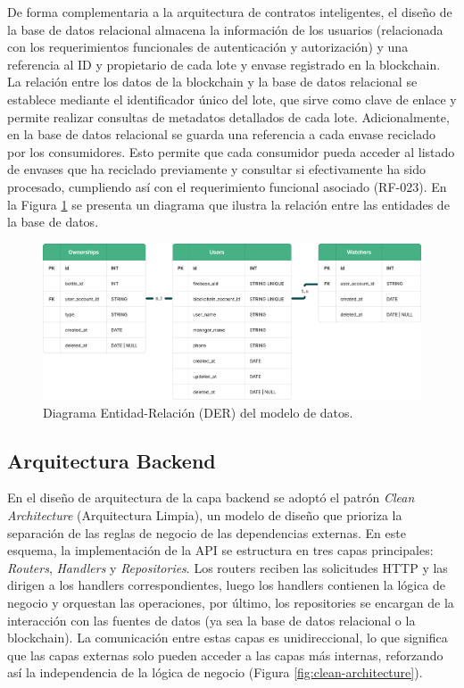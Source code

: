De forma complementaria a la arquitectura de contratos inteligentes, el diseño de la base de datos relacional almacena la información de los usuarios (relacionada con los requerimientos funcionales de autenticación y autorización) y una referencia al ID y propietario de cada lote y envase registrado en la blockchain. La relación entre los datos de la blockchain y la base de datos relacional se establece mediante el identificador único del lote, que sirve como clave de enlace y permite realizar consultas de metadatos detallados de cada lote. Adicionalmente, en la base de datos relacional se guarda una referencia a cada envase reciclado por los consumidores. Esto permite que cada consumidor pueda acceder al listado de envases que ha reciclado previamente y consultar si efectivamente ha sido procesado, cumpliendo así con el requerimiento funcional asociado (RF-023). En la Figura \ref{fig:der} se presenta un diagrama que ilustra la relación entre las entidades de la base de datos.

\begin{figure}[!htb]
    \centering
    \includegraphics[width=\textwidth]{Figures/db-der.png}
    \caption{Diagrama Entidad-Relación (DER) del modelo de datos.}
    \label{fig:der}
\end{figure}

\subsection{Arquitectura Backend}

En el diseño de arquitectura de la capa backend se adoptó el patrón \textit{Clean Architecture} (Arquitectura Limpia), un modelo de diseño que prioriza la separación de las reglas de negocio de las dependencias externas. En este esquema, la implementación de la API se estructura en tres capas principales: \textit{Routers}, \textit{Handlers} y \textit{Repositories}. Los routers reciben las solicitudes HTTP y las dirigen a los handlers correspondientes, luego los handlers contienen la lógica de negocio y orquestan las operaciones, por último, los repositories se encargan de la interacción con las fuentes de datos (ya sea la base de datos relacional o la blockchain). La comunicación entre estas capas es unidireccional, lo que significa que las capas externas solo pueden acceder a las capas más internas, reforzando así la independencia de la lógica de negocio (Figura \ref{fig:clean-architecture}).

